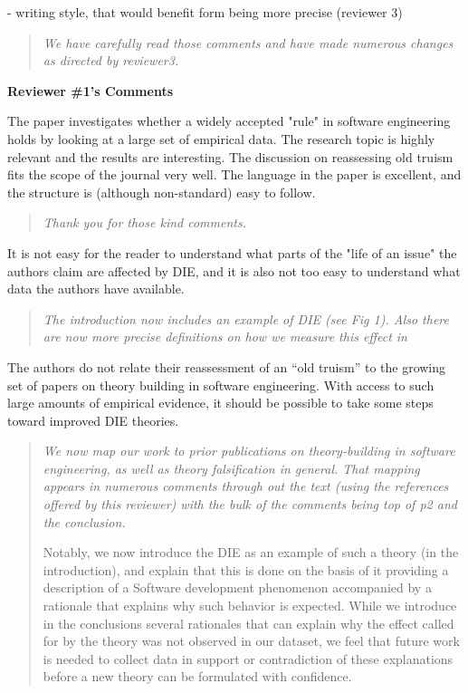  
- writing style, that would benefit form being more
precise (reviewer 3)

\begin{quote}{\em We have carefully read those comments and have made numerous changes
as directed by reviewer3.}\end{quote}

{\bf Reviewer \#1's Comments}


The paper investigates whether a widely
accepted "rule" in software engineering holds by looking at
a large set of empirical data. The research topic is highly
relevant and the results are interesting.   The discussion
on reassessing old truism fits the scope of the journal very
well.  The language in the paper is excellent, and the
structure is (although non-standard) easy to follow.

\begin{quote}{\em Thank you for those kind comments.}\end{quote}

It is not easy for the reader to understand what parts
of the "life of an issue" the authors claim are affected by
DIE, and it is also not too easy to understand what data the
authors have available.  

\begin{quote}{\em  The introduction now includes an example of DIE  (see Fig 1).
Also there are now more precise  definitions on how we measure this effect in }\end{quote}
 
 The authors do not relate their reassessment of an
``old truism'' to the growing set of papers on theory building
in software engineering. With access to such large amounts
of empirical evidence, it should be possible to take some
steps toward improved DIE theories. 

\begin{quote}{\em We now map our work to prior publications on theory-building in software engineering, as well as theory falsification in general. That mapping appears in numerous comments through out the text (using the references offered by this reviewer) with the bulk of the comments being top of p2 and the conclusion. 

Notably, we now introduce the DIE as an example of such a theory (in the introduction), and explain that this is done on the basis of it providing a description of a Software development phenomenon accompanied by a rationale that explains why such behavior is expected. While we introduce in the conclusions several rationales that can explain why the effect called for by the theory was not observed in our dataset, we feel that future work is needed to collect data in support or contradiction of these explanations before a new theory can be formulated with confidence. }\end{quote}

